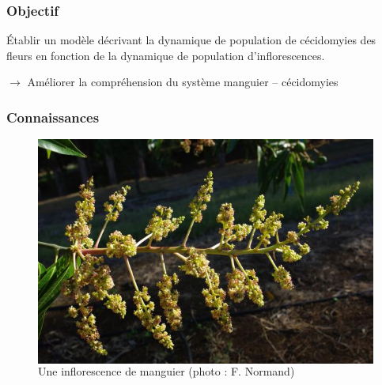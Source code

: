 \documentclass[xcolor={dvipsnames}]{beamer}
\begin{document}
\begin{frame}
\begin{multicols}{2}
 
\end{multicols}
 
\end{frame}


\begin{frame}
 \frametitle{Objectif}
 
 Établir un modèle décrivant la dynamique de population de cécidomyies des fleurs en fonction de la dynamique de population d'inflorescences.
 
 \vspace{1cm}
 
$\longrightarrow$ Améliorer la compréhension du système manguier -- cécidomyies
\end{frame}



\begin{frame}
 \frametitle{Connaissances}
 \begin{figure}[ht]
 \centering
 \begin{columns}
\includegraphics[scale = 0.29]{../photos/inflo3.jpg}
 \caption{Une inflorescence de manguier (photo : F. Normand)}
        \label{fig:inflos}
  \end{columns}

 

\end{figure}
\end{frame}
\end{document}
